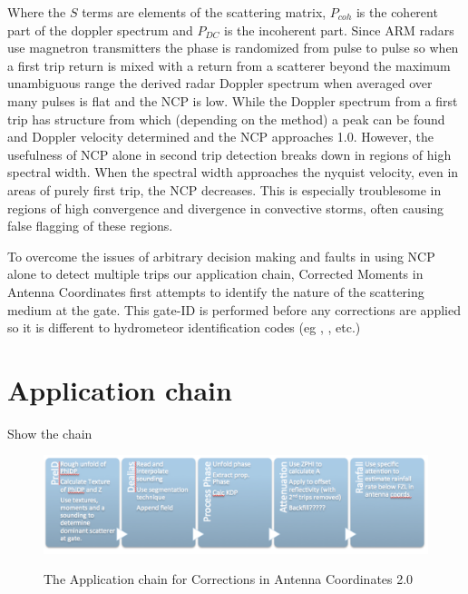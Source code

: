 \documentclass[twocol]{ametsoc}
\begin{document}
Where the $S$ terms are elements of the scattering matrix, $P_{coh}$ is the coherent part of the doppler spectrum and $P_{DC}$ is the incoherent part. Since ARM radars use magnetron transmitters the phase is randomized from pulse to pulse so when a first trip return is mixed with a return from a scatterer beyond the maximum unambiguous range the derived radar Doppler spectrum when averaged over many pulses is flat and the NCP is low. While the Doppler spectrum from a first trip has structure from which (depending on the method) a peak can be found and Doppler velocity determined and the NCP approaches 1.0. However, the usefulness of NCP alone in second trip detection breaks down in regions of high spectral width. When the spectral width approaches the nyquist velocity, even in areas of purely first trip, the NCP decreases. This is especially troublesome in regions of high convergence and divergence in convective storms, often causing false flagging of these regions. 

To overcome the issues of arbitrary decision making and faults in using NCP alone to detect multiple trips our application chain, Corrected Moments in Antenna Coordinates first attempts to identify the nature of the scattering medium at the gate. This gate-ID is performed before any corrections are applied so it is different to hydrometeor identification codes (eg \cite{dolan_theory-based_2009}, \cite{wen_cluster-based_2015}, \cite{al-sakka_new_2013} etc.)


\section{Application chain}
Show the chain
\begin{figure}[h]
    \centering
    \includegraphics[width=0.9\columnwidth]{application_chain.png}
    \label{fig:chain}
    \caption{The Application chain for Corrections in Antenna Coordinates 2.0}
\end{figure}
\end{document}
